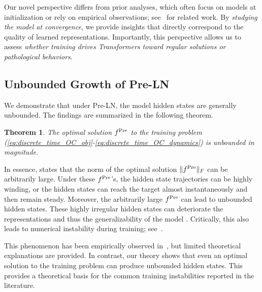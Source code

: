 \documentclass[journal]{IEEEtran}
\theoremstyle{plain}
\newtheorem{theorem}{Theorem}
\theoremstyle{definition}
\theoremstyle{remark}
\begin{document}
Our novel perspective differs from prior analyses, which often focus on models at initialization or rely on empirical observations; see~ for related work. By \emph{studying the model at convergence}, we provide insights that directly correspond to the quality of learned representations. Importantly, this perspective allows us to assess \emph{whether training drives Transformers toward regular solutions or pathological behaviors}.

\subsection{Unbounded Growth of Pre-LN}\label{subsec:Pre_forward}
We demonstrate that under Pre-LN, the model hidden states are generally unbounded. The findings are summarized in the following theorem.

\begin{theorem}\label{thm:Pre-LN_illposed}
    The optimal solution $f^{\rm Pre}$ to the training problem (\ref{eq:discrete_time_OC_obj}-\ref{eq:discrete_time_OC_dynamics})  is unbounded in magnitude.
\end{theorem}

In essence,  states that the norm of the optimal solution $\|f^{\rm Pre}\|_F$ can be arbitrarily large.
Under these $f^{\rm Pre}$'s, the hidden state trajectories can be highly winding, or the hidden states can reach the target almost instantaneously and then remain steady. Moreover, the arbitrarily large $f^{\rm Pre}$ can lead to unbounded hidden states. These highly irregular hidden states can deteriorate the representations and thus the generalizability of the model \cite{zhang2023mean,kan2025optimal}. Critically, this also leads to numerical instability during training; see~.

This phenomenon has been empirically observed in~\cite{sun2024massive,kim2025peri}, but limited theoretical explanations are provided. In contrast, our theory shows that even an optimal solution to the training problem can produce unbounded hidden states. This provides a theoretical basis for the common training instabilities reported in the literature.
\end{document}
